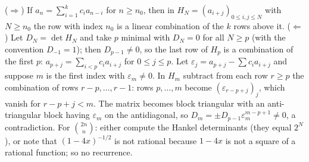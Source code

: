 \documentclass[11pt,a4paper]{article}
\begin{document}
(\(\Rightarrow\)) If \(a_n=\sum_{i=1}^kc_ia_{n-i}\) for \(n\ge n_0\), then in \(H_N=(a_{i+j})_{0\le i,j\le N}\) with \(N\ge n_0\) the row with index \(n_0\) is a linear combination of the \(k\) rows above it.
(\(\Leftarrow\)) Let \(D_N=\det H_N\) and take \(p\) minimal with \(D_N=0\) for all \(N\ge p\) (with the convention \(D_{-1}=1\)); then \(D_{p-1}\ne0\), so the last row of \(H_p\) is a combination of the first \(p\): \(a_{p+j}=\sum_{i\lt p}c_ia_{i+j}\) for \(0\le j\le p\). Let \(\varepsilon_j=a_{p+j}-\sum c_ia_{i+j}\) and suppose \(m\) is the first index with \(\varepsilon_m\ne0\).
In \(H_m\) subtract from each row \(r\ge p\) the combination of rows \(r-p,\dots,r-1\): rows \(p,\dots,m\) become \((\varepsilon_{r-p+j})_j\), which vanish for \(r-p+j\lt m\). The matrix becomes block triangular with an anti-triangular block having \(\varepsilon_m\) on the antidiagonal, so \(D_m=\pm D_{p-1}\varepsilon_m^{m-p+1}\ne0\), a contradiction. For \(\binom{2n}n\): either compute the Hankel determinants (they equal \(2^N\)), or note that \((1-4x)^{-1/2}\) is not rational because \(1-4x\) is not a square of a rational function; so no recurrence.
\end{document}
